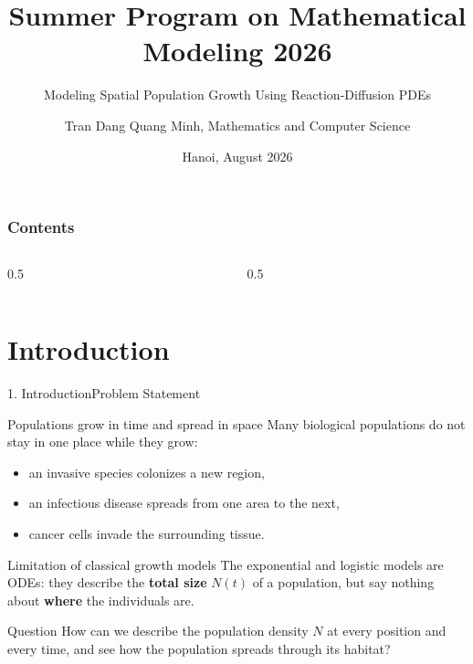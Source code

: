 \documentclass[10pt]{beamer}
\title[Summer Program on Mathematical Modeling 2026]{Summer Program on Mathematical Modeling 2026}
\subtitle{Modeling Spatial Population Growth Using Reaction-Diffusion PDEs}
\author[Modeling Spatial Population Growth Using PDEs]{Tran Dang Quang Minh, Mathematics and Computer Science}
\institute[]{
SPMM2026 \hspace{0.25cm} VNU Hanoi University of Science

\hspace{1cm} Nara Women's University
}
\date[Hanoi, August 2026]
{Hanoi, August 2026}
\begin{document}
\frame{\titlepage}
\begin{frame}
\frametitle{Contents}
\begin{columns}[t]
  \begin{column}{0.5\textwidth}
    \tableofcontents[sections={1-4}]
  \end{column}
  \begin{column}{0.5\textwidth}
    \tableofcontents[sections={5-7}]
  \end{column}
\end{columns}
\end{frame}
\section{Introduction}
    \begin{frame}{1. Introduction}{Problem Statement}
      \begin{block}{Populations grow in time and spread in space}
          Many biological populations do not stay in one place while they grow:
          \begin{itemize}
              \item an invasive species colonizes a new region,
              \item an infectious disease spreads from one area to the next,
              \item cancer cells invade the surrounding tissue.
          \end{itemize}
      \end{block}
      \begin{block}{Limitation of classical growth models}
          The exponential and logistic models are ODEs: they describe the \textbf{total size} $N(t)$ of a population, but say nothing about \textbf{where} the individuals are.
      \end{block}
      \begin{alertblock}{Question}
          How can we describe the population density $N$ at every position and every time, and see how the population spreads through its habitat?
      \end{alertblock}
    \end{frame}
\end{document}
